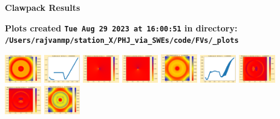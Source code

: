 \documentclass[11pt]{article}
\begin{document}
        \begin{center}{\Large\bf Clawpack Results}\vskip 5pt
        
        \bf Plots created {\tt Tue Aug 29 2023 at 16:00:51} in directory: \vskip 5pt
        \verb+/Users/rajvanmp/station_X/PHJ_via_SWEs/code/FVs/_plots+
        \end{center}
        \vskip 5pt
        \includegraphics[width=0.11875\textwidth]{frame0000fig0.png}
\includegraphics[width=0.11875\textwidth]{frame0000fig1.png}
\includegraphics[width=0.11875\textwidth]{frame0000fig2.png}
\includegraphics[width=0.11875\textwidth]{frame0000fig3.png}
\includegraphics[width=0.11875\textwidth]{frame0001fig0.png}
\includegraphics[width=0.11875\textwidth]{frame0001fig1.png}
\includegraphics[width=0.11875\textwidth]{frame0001fig2.png}
\includegraphics[width=0.11875\textwidth]{frame0001fig3.png}
\vskip 10pt 
\includegraphics[width=0.11875\textwidth]{frame0002fig0.png}
\end{document}

